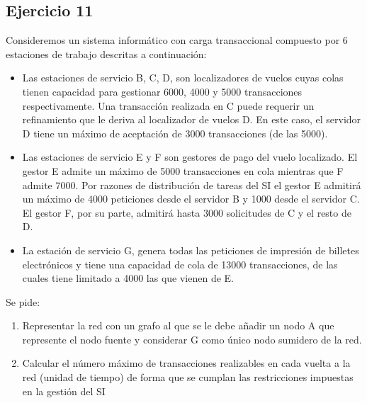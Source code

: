 \subsection{Ejercicio 11}
Consideremos  un  sistema  informático  con  carga  transaccional  compuesto  por  6  estaciones  de  trabajo descritas a continuación:
\begin{itemize}
    \item Las  estaciones  de  servicio  B,  C,  D,  son  localizadores  de  vuelos  cuyas  colas  tienen  capacidad  para gestionar 6000,  4000  y 5000  transacciones  respectivamente.  Una  transacción  realizada  en  C  puede requerir un refinamiento que le deriva al localizador de vuelos D. En este caso, el servidor D tiene un máximo de aceptación de 3000 transacciones (de las 5000).
    \item Las  estaciones  de  servicio  E  y  F  son  gestores  de  pago  del  vuelo  localizado.  El  gestor  E  admite  un máximo de 5000 transacciones en cola mientras que F admite 7000. Por razones de distribución de tareas del SI el gestor E admitirá un máximo de 4000 peticiones desde el servidor B y 1000 desde el servidor C. El gestor F, por su parte, admitirá hasta 3000 solicitudes de C y el resto de D.
    \item La  estación  de  servicio  G,  genera  todas  las  peticiones  de  impresión  de  billetes  electrónicos  y  tiene una capacidad de cola de 13000 transacciones, de las cuales tiene limitado a 4000 las que vienen de E.
\end{itemize}
Se pide:
\begin{enumerate}
    \item Representar  la  red  con  un  grafo  al  que  se  le  debe  añadir  un  nodo  A  que  represente  el  nodo fuente y considerar G como único nodo sumidero de la red.
    \begin{tcolorbox}[colback=white,colframe=cyan!50!black,fonttitle=\bfseries]

    \end{tcolorbox}
    \item Calcular  el  número  máximo  de  transacciones  realizables  en  cada  vuelta  a  la  red  (unidad  de tiempo) de forma que se cumplan las restricciones impuestas en la gestión del SI
    \begin{tcolorbox}[colback=white,colframe=cyan!50!black,fonttitle=\bfseries]

    \end{tcolorbox}
\end{enumerate}


